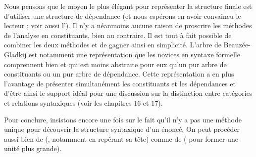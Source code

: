 Nous pensons que le moyen le plus élégant pour représenter la structure finale est d’utiliser une structure de dépendance (et nous espérons en avoir convaincu le lecteur ; voir aussi l’). Il n’y a néanmoins aucune raison de proscrire les méthodes de l’analyse en constituants, bien au contraire. Il est tout à fait possible de combiner les deux méthodes et de gagner ainsi en simplicité. L’arbre de Beauzée-Gladkij est notamment une représentation que les novices en syntaxe formelle comprennent bien et qui est moins abstraite pour eux qu’un pur arbre de constituants ou un pur arbre de dépendance. Cette représentation a en plus l’avantage de présenter simultanément les constituants et les dépendances et d’être ainsi le support idéal pour une discussion sur la distinction entre catégories et relations syntaxiques (voir les chapitres 16 et 17). %

Pour conclure, insistons encore une fois sur le fait qu’il n’y a pas une méthode unique pour découvrir la structure syntaxique d’un énoncé. On peut procéder aussi bien de  (, notamment en repérant sa tête) comme de  ( pour former une unité plus grande).

